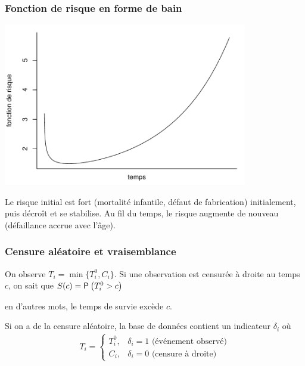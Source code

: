 \documentclass{beamer}
\begin{document}
\begin{frame}
\frametitle{Fonction de risque en forme de bain}
\begin{center}
\includegraphics[width = 0.8\textwidth]{img/c7/07-bathtub-hazard-fr.pdf}
\end{center}
{\footnotesize

Le risque initial est fort (mortalité infantile, défaut de fabrication) initialement, puis décroît et se stabilise. Au fil du temps, le risque augmente de nouveau (défaillance accrue avec l'âge).

}
\end{frame}

\begin{frame}
\frametitle{Censure aléatoire et vraisemblance}
On observe $T_i = \min\{T_i^0, C_i\}$. Si une observation est censurée à droite au temps $c$, on sait que $S(c)=\P{T_i^0 > c}$
\bi \item en d'autres mots, le temps de survie excède $c$.
\ei

Si on a de la censure aléatoire, la base de données contient un indicateur $\delta_i$ où
\begin{align*}
T_i = 
\begin{cases}
T_i^0, & \delta_i=1 \text{ (événement observé)}\\
C_i, & \delta_i=0 \text{ (censure à droite)}
\end{cases}
\end{align*}
\end{frame}
\end{document}

